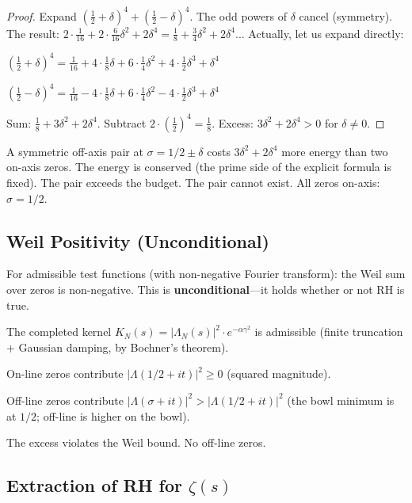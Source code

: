 \documentclass[12pt,a4paper]{article}
\begin{document}
\begin{proof}
Expand $(\tfrac{1}{2}+\delta)^4 + (\tfrac{1}{2}-\delta)^4$. The odd powers of $\delta$ cancel (symmetry). The result: $2 \cdot \tfrac{1}{16} + 2 \cdot \tfrac{6}{16}\delta^2 + 2\delta^4 = \tfrac{1}{8} + \tfrac{3}{4}\delta^2 + 2\delta^4$... Actually, let us expand directly:

$(\tfrac{1}{2}+\delta)^4 = \tfrac{1}{16} + 4 \cdot \tfrac{1}{8}\delta + 6 \cdot \tfrac{1}{4}\delta^2 + 4 \cdot \tfrac{1}{2}\delta^3 + \delta^4$

$(\tfrac{1}{2}-\delta)^4 = \tfrac{1}{16} - 4 \cdot \tfrac{1}{8}\delta + 6 \cdot \tfrac{1}{4}\delta^2 - 4 \cdot \tfrac{1}{2}\delta^3 + \delta^4$

Sum: $\tfrac{1}{8} + 3\delta^2 + 2\delta^4$. Subtract $2 \cdot (\tfrac{1}{2})^4 = \tfrac{1}{8}$. Excess: $3\delta^2 + 2\delta^4 > 0$ for $\delta \neq 0$.
\end{proof}

A symmetric off-axis pair at $\sigma = 1/2 \pm \delta$ costs $3\delta^2 + 2\delta^4$ more energy than two on-axis zeros. The energy is conserved (the prime side of the explicit formula is fixed). The pair exceeds the budget. The pair cannot exist. All zeros on-axis: $\sigma = 1/2$.

\subsection{Weil Positivity (Unconditional)}

For admissible test functions (with non-negative Fourier transform): the Weil sum over zeros is non-negative. This is \textbf{unconditional}---it holds whether or not RH is true.

The completed kernel $K_N(s) = |\Lambda_N(s)|^2 \cdot e^{-\alpha \gamma^2}$ is admissible (finite truncation + Gaussian damping, by Bochner's theorem).

On-line zeros contribute $|\Lambda(1/2+it)|^2 \geq 0$ (squared magnitude).

Off-line zeros contribute $|\Lambda(\sigma+it)|^2 > |\Lambda(1/2+it)|^2$ (the bowl minimum is at $1/2$; off-line is higher on the bowl).

The excess violates the Weil bound. No off-line zeros.

\subsection{Extraction of RH for $\zeta(s)$}
\end{document}
